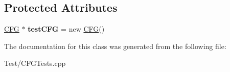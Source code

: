 \subsection*{Protected Attributes}
\begin{DoxyCompactItemize}
\item 
\mbox{\label{classCFGTests_a630275f74118e1f25b0f4c1869a81f73}} 
\hyperlink{classCFG}{C\+FG} $\ast$ {\bfseries test\+C\+FG} = new \hyperlink{classCFG}{C\+FG}()
\end{DoxyCompactItemize}


The documentation for this class was generated from the following file\+:\begin{DoxyCompactItemize}
\item 
Test/C\+F\+G\+Tests.\+cpp\end{DoxyCompactItemize}
